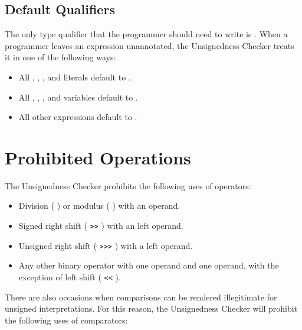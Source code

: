 \subsection{Default Qualifiers\label{unsignedness-checker-annotations-default-qualifiers}}

The only type qualifier that the programmer should need to write is
. When a programmer leaves an expression unannotated, the
Unsignedness Checker treats it in one of the following ways:

\begin{itemize}

    \item
    All , , , and  literals default
    to .
    \item
    All , , , and  variables default
    to .
    \item
    All other expressions default to .

\end{itemize}

\section{Prohibited Operations\label{unsignedness-checker-Prohibited-Operations}}

The Unsignedness Checker prohibits the following uses of operators:

\begin{itemize}

    \item   
    Division ( \code{/} ) or modulus ( \code{\%} ) with an 
    operand.
    \item   
    Signed right shift ( \verb|>>| ) with an  left operand.
    \item   
    Unsigned right shift ( \verb|>>>| ) with a  left operand.
    \item   
    Any other binary operator with one  operand and one
     operand, with the exception of left shift ( \verb|<<| ).

\end{itemize}

There are also occasions when comparisons can be rendered illegitimate for
unsigned interpretations. For this reason, the Unsignedness Checker will prohibit the following uses of comparators:

